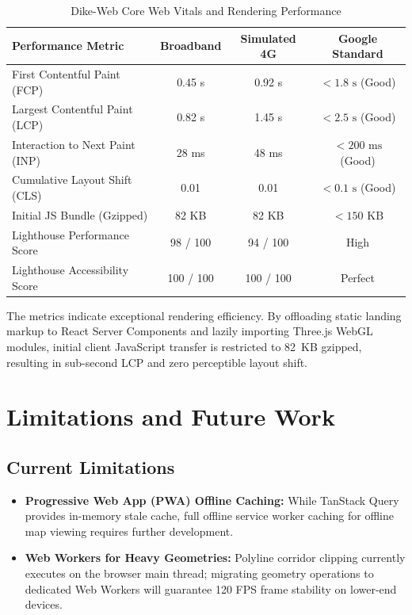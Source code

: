 \documentclass[conference,10pt,a4paper]{IEEEtran}
\begin{document}
\begin{table}[!ht]
\caption{Dike-Web Core Web Vitals and Rendering Performance}
\label{tab:web_vitals}
\centering
\scriptsize
\begin{tabularx}{\columnwidth}{Xccc}
\toprule
\textbf{Performance Metric} & \textbf{Broadband} & \textbf{Simulated 4G} & \textbf{Google Standard} \\
\midrule
First Contentful Paint (FCP) & 0.45 s & 0.92 s & $< 1.8\text{ s}$ (Good) \\
Largest Contentful Paint (LCP) & 0.82 s & 1.45 s & $< 2.5\text{ s}$ (Good) \\
Interaction to Next Paint (INP) & 28 ms & 48 ms & $< 200\text{ ms}$ (Good) \\
Cumulative Layout Shift (CLS) & 0.01 & 0.01 & $< 0.1\text{ s}$ (Good) \\
Initial JS Bundle (Gzipped) & 82 KB & 82 KB & $< 150\text{ KB}$ \\
Lighthouse Performance Score & 98 / 100 & 94 / 100 & High \\
Lighthouse Accessibility Score & 100 / 100 & 100 / 100 & Perfect \\
\bottomrule
\end{tabularx}
\end{table}

The metrics indicate exceptional rendering efficiency. By offloading static landing markup to React Server Components and lazily importing Three.js WebGL modules, initial client JavaScript transfer is restricted to 82~KB gzipped, resulting in sub-second LCP and zero perceptible layout shift.

\section{Limitations and Future Work}

\subsection{Current Limitations}
\begin{itemize}
    \item \textbf{Progressive Web App (PWA) Offline Caching:} While TanStack Query provides in-memory stale cache, full offline service worker caching for offline map viewing requires further development.
    \item \textbf{Web Workers for Heavy Geometries:} Polyline corridor clipping currently executes on the browser main thread; migrating geometry operations to dedicated Web Workers will guarantee 120 FPS frame stability on lower-end devices.
\end{itemize}
\end{document}
